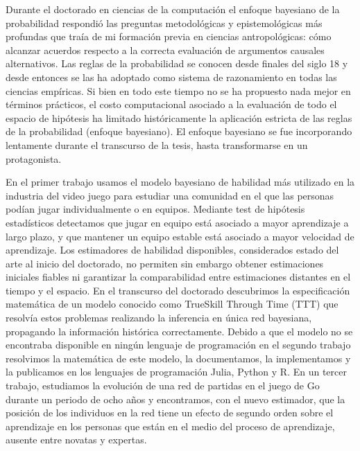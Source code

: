 \documentclass[a4paper,11pt]{book}
\theoremstyle{definition}
\begin{document}

Durante el doctorado en ciencias de la computaci\'on el enfoque bayesiano de la probabilidad respondi\'o las preguntas metodol\'ogicas y epistemol\'ogicas m\'as profundas que tra\'ia de mi formaci\'on previa en ciencias antropol\'ogicas: c\'omo alcanzar acuerdos respecto a la correcta evaluaci\'on de argumentos causales alternativos.
%
Las reglas de la probabilidad se conocen desde finales del siglo 18 y desde entonces se las ha adoptado como sistema de razonamiento en todas las ciencias emp\'iricas.
%
Si bien en todo este tiempo no se ha propuesto nada mejor en t\'erminos pr\'acticos, el costo computacional asociado a la evaluaci\'on de todo el espacio de hip\'otesis ha limitado hist\'oricamente la aplicaci\'on estricta de las reglas de la probabilidad (enfoque bayesiano).
%
El enfoque bayesiano se fue incorporando lentamente durante el transcurso de la tesis, hasta transformarse en un protagonista.

%

En el primer trabajo usamos el modelo bayesiano de habilidad m\'as utilizado en la industria del video juego para estudiar una comunidad en el que las personas pod\'ian jugar individualmente o en equipos.
%
Mediante test de hip\'otesis estad\'isticos detectamos que jugar en equipo est\'a asociado a mayor aprendizaje a largo plazo, y que mantener un equipo estable est\'a asociado a mayor velocidad de aprendizaje.
%
Los estimadores de habilidad disponibles, considerados estado del arte al inicio del doctorado, no permiten sin embargo obtener estimaciones iniciales fiables ni garantizar la comparabilidad entre estimaciones distantes en el tiempo y el espacio.
%
En el transcurso del doctorado descubrimos la especificaci\'on matem\'atica de un modelo conocido como TrueSkill Through Time (TTT) que resolv\'ia estos problemas realizando la inferencia en \'unica red bayesiana, propagando la informaci\'on hist\'orica correctamente.
%
Debido a que el modelo no se encontraba disponible en ning\'un lenguaje de programaci\'on en el segundo trabajo resolvimos la matem\'atica de este modelo, la documentamos, la implementamos y la publicamos en los lenguajes de programaci\'on Julia, Python y R.
%
En un tercer trabajo, estudiamos la evoluci\'on de una red de partidas en el juego de Go durante un periodo de ocho a\~nos y encontramos, con el nuevo estimador, que la posici\'on de los individuos en la red tiene un efecto de segundo orden sobre el aprendizaje en los personas que est\'an en el medio del proceso de aprendizaje, ausente entre novatas y expertas.
\end{document}
